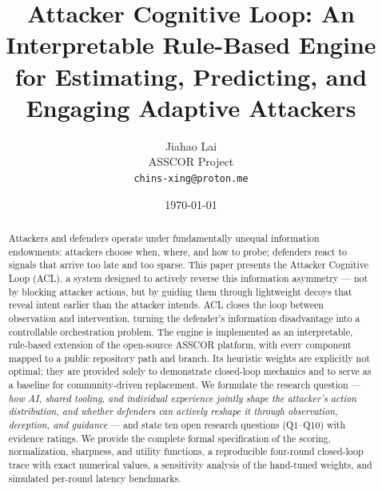 \documentclass[11pt]{article}
\title{\bfseries Attacker Cognitive Loop: An Interpretable Rule-Based Engine for Estimating, Predicting, and Engaging Adaptive Attackers}
\author{Jiahao Lai \\
  \small ASSCOR Project \\
  \small \texttt{chins-xing@proton.me}}
\date{\today}
\begin{document}
\maketitle

\begin{center}
\end{center}

\begin{abstract}
Attackers and defenders operate under fundamentally unequal information endowments: attackers choose when, where, and how to probe; defenders react to signals that arrive too late and too sparse. This paper presents the Attacker Cognitive Loop (ACL), a system designed to actively reverse this information asymmetry --- not by blocking attacker actions, but by guiding them through lightweight decoys that reveal intent earlier than the attacker intends. ACL closes the loop between observation and intervention, turning the defender's information disadvantage into a controllable orchestration problem. The engine is implemented as an interpretable, rule-based extension of the open-source ASSCOR platform, with every component mapped to a public repository path and branch. Its heuristic weights are explicitly not optimal; they are provided solely to demonstrate closed-loop mechanics and to serve as a baseline for community-driven replacement. We formulate the research question --- \textit{how AI, shared tooling, and individual experience jointly shape the attacker's action distribution, and whether defenders can actively reshape it through observation, deception, and guidance} --- and state ten open research questions (Q1--Q10) with evidence ratings. We provide the complete formal specification of the scoring, normalization, sharpness, and utility functions, a reproducible four-round closed-loop trace with exact numerical values, a sensitivity analysis of the hand-tuned weights, and simulated per-round latency benchmarks.
\end{abstract}
\end{document}
